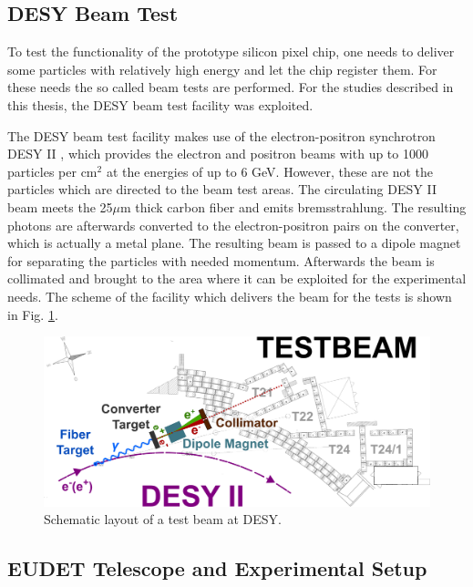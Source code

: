 \subsection{DESY Beam Test}

To test the functionality of the prototype silicon pixel chip, one needs to deliver some particles with relatively high energy and let
the chip register them. For these needs the so called beam tests are performed. For the studies described in this thesis, the DESY beam test
facility was exploited.

The DESY beam test facility makes use of the electron-positron synchrotron DESY II \cite{Hemmie:1982xq, DESYIIWeb}, which provides the electron
and positron beams with up to 1000 particles per cm$^{2}$ at the energies of up to 6 GeV. However, these are not the particles which are directed
to the beam test areas. The circulating DESY II beam meets the 25$\mu$m thick carbon fiber and emits bremsstrahlung. The resulting photons are afterwards 
converted to the electron-positron pairs on the converter, which is actually a metal plane. The resulting beam is passed to a dipole magnet for
separating the particles with needed momentum. Afterwards the beam is collimated and brought to the area where it can be exploited for the
experimental needs. The scheme of the facility which delivers the beam for the tests is shown in Fig. \ref{fig:desy_tb}.

\begin{figure}[t]
 \centering
 \includegraphics[width=1.0\textwidth]{021_pixel_upgrade/plots/desy_tb-sketch.png}
 \caption{Schematic layout of a test beam at DESY.}
 \label{fig:desy_tb}
\end{figure}

\subsection{EUDET Telescope and Experimental Setup} 

